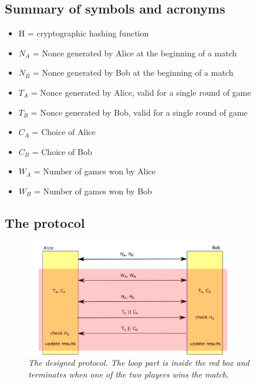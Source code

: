 \documentclass[11 pt]{article}
\begin{document}
\subsection{Summary of symbols and acronyms}
\begin{itemize}
	\item H = cryptographic hashing function
	\item $N_A$ = Nonce generated by Alice at the beginning of a match
	\item $N_B$ = Nonce generated by Bob at the beginning of a match
	\item $T_A$ = Nonce generated by Alice, valid for a single round of game
	\item $T_B$ = Nonce generated by Bob, valid for a single round of game
	\item $C_A$ = Choice of Alice
	\item $C_B$ = Choice of Bob
	\item $W_A$ = Number of games won by Alice
	\item $W_B$ = Number of games won by Bob
\end{itemize}

\subsection{The protocol}
\begin{figure}[!ht]
	\centering %
	\includegraphics[width=0.8\textwidth]{protocol-hw6-1699981.png} %
	\caption{\textit{The designed protocol. The loop part is inside the red box and terminates when one of the two players wins the match.}} %
	\label{fig:protocol}
\end{figure}
\end{document}
